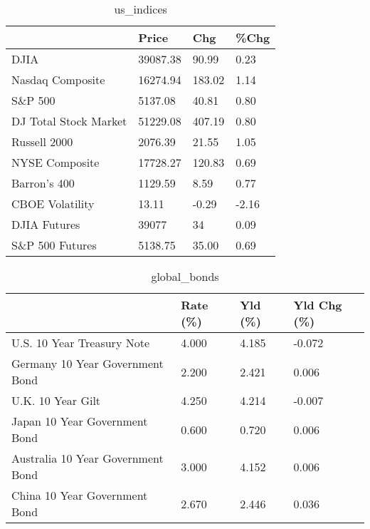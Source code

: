 \documentclass{article}%
\begin{document}
%


\begin{table}[htbp]%
\caption{us\_indices}%
\centering%
\begin{adjustbox}{width=1\textwidth}%
\begin{tabular}{llll}
\toprule
                      &    Price &    Chg &  \%Chg \\
\midrule
                 DJIA & 39087.38 &  90.99 &  0.23 \\
     Nasdaq Composite & 16274.94 & 183.02 &  1.14 \\
              S\&P 500 &  5137.08 &  40.81 &  0.80 \\
DJ Total Stock Market & 51229.08 & 407.19 &  0.80 \\
         Russell 2000 &  2076.39 &  21.55 &  1.05 \\
       NYSE Composite & 17728.27 & 120.83 &  0.69 \\
         Barron's 400 &  1129.59 &   8.59 &  0.77 \\
      CBOE Volatility &    13.11 &  -0.29 & -2.16 \\
         DJIA Futures &    39077 &     34 &  0.09 \\
      S\&P 500 Futures &  5138.75 &  35.00 &  0.69 \\
\bottomrule
\end{tabular}
%
\end{adjustbox}%
\end{table}

%


\begin{table}[htbp]%
\caption{global\_bonds}%
\centering%
\begin{adjustbox}{width=1\textwidth}%
\begin{tabular}{llll}
\toprule
                                  & Rate (\%) & Yld (\%) & Yld Chg (\%) \\
\midrule
       U.S. 10 Year Treasury Note &    4.000 &   4.185 &      -0.072 \\
  Germany 10 Year Government Bond &    2.200 &   2.421 &       0.006 \\
                U.K. 10 Year Gilt &    4.250 &   4.214 &      -0.007 \\
    Japan 10 Year Government Bond &    0.600 &   0.720 &       0.006 \\
Australia 10 Year Government Bond &    3.000 &   4.152 &       0.006 \\
    China 10 Year Government Bond &    2.670 &   2.446 &       0.036 \\
\bottomrule
\end{tabular}
%
\end{adjustbox}%
\end{table}
\end{document}
